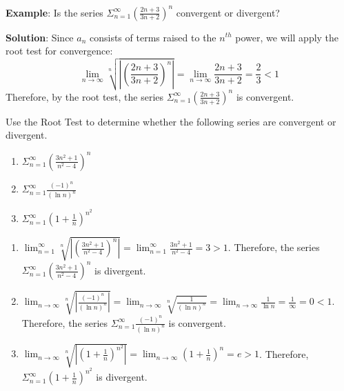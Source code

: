 \textbf{Example}: Is the series $\Sigma_{n=1}^\infty \left( \frac{2n + 3}{3n + 
2} \right)^n$ convergent or divergent?

\textbf{Solution}: Since $a_n$ consists of terms raised to the $n^{th}$ power, 
we will apply the root test for convergence:
$$\lim_{n \to \infty} \sqrt[n]{\left| \left( \frac{2n+3}{3n+2} \right)^n 
\right|} = \lim_{n \to \infty} \frac{2n+3}{3n+2} = \frac{2}{3} < 1$$ 
Therefore, by the root test, the series $\Sigma_{n=1}^\infty \left( \frac{2n + 
3}{3n + 2} \right)^n$ is convergent. 

\begin{Exercise}[label=root1]
Use the Root Test to determine whether the following series are convergent or 
divergent.
\begin{enumerate}
\item $\Sigma_{n=1}^\infty \left( \frac{3n^2 + 1}{n^2 - 4} \right)^n$
\item $\Sigma_{n=1}^\infty \frac{(-1)^{n}}{(\ln{n})^n}$
\item $\Sigma_{n=1}^\infty \left( 1+ \frac{1}{n} \right)^{n^2}$
\end{enumerate}
\end{Exercise}

\begin{Answer}
\begin{enumerate}
\item $\lim_{n=1}^\infty \sqrt[n]{\left| \left( \frac{3n^2 + 1}{n^2 - 4} \right)^n 
\right|} = \lim_{n=1}^\infty \frac{3n^2 + 1}{n^2 - 4} = 3 >1$. Therefore, 
the series $\Sigma_{n=1}^\infty \left( \frac{3n^2 + 1}{n^2 - 4} \right)^n$ is 
divergent.
\item $\lim_{n \to \infty} \sqrt[n]{\left| \frac{(-1)^{n}}{(\ln{n})^n} \right|} 
= \lim_{n \to \infty} \sqrt[n]{\frac{1}{(\ln{n})^n}} = \lim_{n \to \infty} 
\frac{1}{\ln{n}} = \frac{1}{\infty} = 0 < 1$. Therefore, the series $\Sigma_
{n=1}^\infty \frac{(-1)^{n}}{(\ln{n})^n}$ is convergent.
\item $\lim_{n \to \infty} \sqrt[n]{\left| \left( 1 + \frac{1}{n} \right)^{n^2} 
\right|} = \lim_{n \to \infty} \left(1 + \frac{1}{n} \right)^n = e > 1$. 
Therefore, $\Sigma_{n=1}^\infty \left( 1+ \frac{1}{n} \right)^{n^2}$ is divergent. 
\end{enumerate}
\end{Answer}

